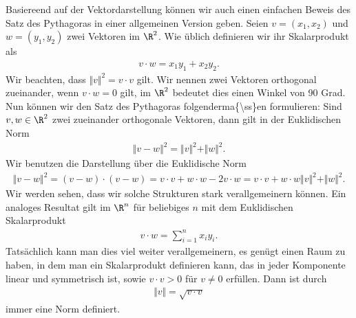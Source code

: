\documentclass[letterpaper,10pt,english]{jupyterBook}
\begin{document}
Basiereend auf der Vektordarstellung können wir auch einen einfachen Beweis des Satz des Pythagoras in einer allgemeinen Version geben. Seien \(v=(x_1,x_2)\) und \(w=(y_1,y_2)\) zwei Vektoren im \(\R^2\). Wie üblich definieren wir ihr Skalarprodukt als
\begin{equation*}
\begin{split} v \cdot w = x_1 y_1 + x_2 y_2 . \end{split}
\end{equation*}
Wir beachten, dass \(\Vert v \Vert^2 = v \cdot v\) gilt.
Wir nennen zwei Vektoren orthogonal zueinander, wenn \(v \cdot w = 0\) gilt, im \(\R^2\) bedeutet dies einen Winkel von 90 Grad.
Nun können wir den Satz des Pythagoras folgenderma\{\textbackslash{}ss\}en formulieren: Sind \(v,w \in \R^2\) zwei zueinander orthogonale Vektoren, dann gilt in der Euklidischen Norm
\begin{equation*}
\begin{split} \Vert v - w \Vert^2 =  \Vert v \Vert^2 + \Vert w \Vert^2. \end{split}
\end{equation*}
Wir benutzen die Darstellung über die Euklidische Norm
\begin{equation*}
\begin{split} \Vert v - w \Vert^2 = (v-w) \cdot (v-w) = v \cdot v + w\cdot w - 2 v \cdot w = v \cdot v + w\cdot w  \Vert v \Vert^2 + \Vert w \Vert^2. \end{split}
\end{equation*}
Wir werden sehen, dass wir solche Strukturen stark verallgemeinern können. Ein analoges Resultat gilt im \(\R^n\) für beliebiges \(n\) mit dem Euklidischen Skalarprodukt
\begin{equation*}
\begin{split} v \cdot w = \sum_{i=1}^n x_i y_i . \end{split}
\end{equation*}
Tatsächlich kann man dies viel weiter verallgemeinern, es genügt einen Raum zu haben, in dem man ein Skalarprodukt definieren kann, das in jeder Komponente linear und symmetrisch ist, sowie \(v \cdot v > 0 \) für \(v \neq 0\) erfüllen.
Dann ist durch
\begin{equation*}
\begin{split} \Vert v \Vert = \sqrt{ v \cdot v} \end{split}
\end{equation*}
immer eine Norm definiert.
\end{document}
